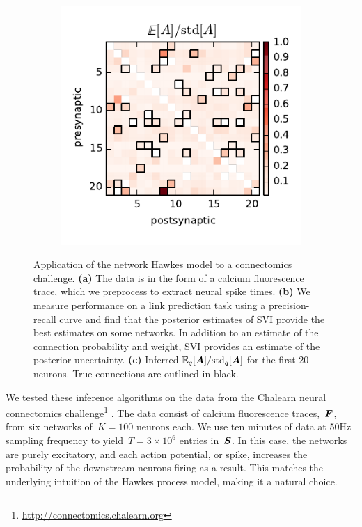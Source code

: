 \begin{figure}[t!]
\begin{center}
\begin{subfigure}[b]{0.32\linewidth}
      \label{fig:connectomics_prc}
    \end{subfigure}
    ~
    \begin{subfigure}[b]{0.32\linewidth}
      \caption{}
      \centering
      \includegraphics[width=\textwidth]{figures/ch2b/chalearn_confidence.pdf} 
      \label{fig:connectomics_zscore}
    \end{subfigure}
    \caption[Discrete time Hawkes process applied to connectomics challenge]{
      Application of the network Hawkes model to a connectomics challenge.
      \textbf{(a)} The data is in the form of a calcium fluorescence trace, which we preprocess to extract neural spike times.
      \textbf{(b)} We measure performance on a link prediction task using a precision-recall curve and find that the posterior estimates of SVI provide the best estimates on some networks. In addition to an estimate of the connection probability and weight, SVI provides an estimate of the posterior uncertainty.
      \textbf{(c)} Inferred $\mathbb{E}_q[\boldsymbol{A}] / \text{std}_q[\boldsymbol{A}]$ for the first 20 neurons. True connections are outlined in black.}
    \label{fig:connectomics}
  \end{center}
\end{figure}

We tested these inference algorithms on the data from the Chalearn neural connectomics challenge\footnote{\url{http://connectomics.chalearn.org}} \cite{Stetter-2012}.
The data consist of calcium fluorescence traces,~$\boldsymbol{F}$, from six networks of~$K=100$ neurons each. We use ten minutes of data at 50Hz sampling frequency to yield~$T=3\times 10^6$ entries in~$\boldsymbol{S}$.
In this case, the networks are purely excitatory, and each action potential, or spike, increases the probability of the downstream neurons firing as a result.
This matches the underlying intuition of the Hawkes process model, making it a natural choice.  

